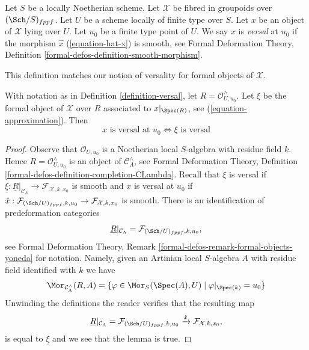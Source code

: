 \begin{definition}
\label{definition-versal}
Let $S$ be a locally Noetherian scheme.
Let $\mathcal{X}$ be fibred in groupoids over $(\Sch/S)_{fppf}$.
Let $U$ be a scheme locally of finite type over $S$.
Let $x$ be an object of $\mathcal{X}$ lying over $U$.
Let $u_0$ be a finite type point of $U$.
We say $x$ is {\it versal} at $u_0$ if the morphism $\hat x$
(\ref{equation-hat-x}) is smooth, see Formal Deformation Theory, Definition
\ref{formal-defos-definition-smooth-morphism}.
\end{definition}

\noindent
This definition matches our notion of versality for formal objects of
$\mathcal{X}$.

\begin{lemma}
\label{lemma-versality-matches}
With notation as in Definition \ref{definition-versal}, let $R = \mathcal{O}_{U, u_0}^\wedge$.
Let $\xi$ be the formal object of $\mathcal{X}$
over $R$ associated to $x|_{\Spec(R)}$, see (\ref{equation-approximation}).
Then
$$
x\text{ is versal at }u_0
\Leftrightarrow
\xi\text{ is versal}
$$
\end{lemma}

\begin{proof}
Observe that $\mathcal{O}_{U, u_0}$ is a Noetherian local $S$-algebra
with residue field $k$. Hence $R = \mathcal{O}_{U, u_0}^\wedge$ is an object of
$\mathcal{C}_\Lambda^\wedge$, see Formal Deformation Theory, Definition
\ref{formal-defos-definition-completion-CLambda}.
Recall that $\xi$ is versal if
$\underline{\xi} : \underline{R}|_{\mathcal{C}_\Lambda} \to
\mathcal{F}_{\mathcal{X}, k, x_0}$
is smooth and $x$ is versal at $u_0$ if
$\hat x : \mathcal{F}_{(\Sch/U)_{fppf}, k, u_0}
\to \mathcal{F}_{\mathcal{X}, k, x_0}$ is smooth.
There is an identification of predeformation categories
$$
\underline{R}|_{\mathcal{C}_\Lambda}
=
\mathcal{F}_{(\Sch/U)_{fppf}, k, u_0},
$$
see Formal Deformation Theory, Remark
\ref{formal-defos-remark-formal-objects-yoneda} for notation.
Namely, given an Artinian local $S$-algebra $A$ with residue field
identified with $k$ we have
$$
\Mor_{\mathcal{C}_\Lambda^\wedge}(R, A) =
\{\varphi \in \Mor_S(\Spec(A), U) \mid \varphi|_{\Spec(k)} = u_0\}
$$
Unwinding the definitions the reader verifies that the resulting map
$$
\underline{R}|_{\mathcal{C}_\Lambda} =
\mathcal{F}_{(\Sch/U)_{fppf}, k, u_0}
\xrightarrow{\hat x}
\mathcal{F}_{\mathcal{X}, k, x_0},
$$
is equal to $\underline{\xi}$ and we see that the lemma is true.
\end{proof}

